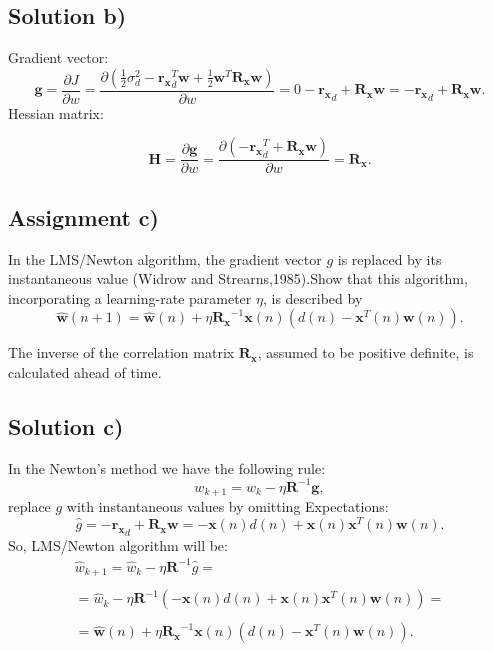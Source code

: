 \documentclass[a4paper, 12pt]{article}
\begin{document}
\subsection*{Solution b)}
Gradient vector:
\begin{equation*}
  \mathbf{g}= \frac{\partial J}{\partial w} = \frac{\partial (\frac{1}{2}\sigma_d^2 - \mathbf{r_x}_d^T\mathbf{w} +\frac{1}{2}\mathbf{w}^T \mathbf{R_x} \mathbf{w})}{\partial w} = 0-\mathbf{r_x}_d+\mathbf{R_x} \mathbf{w} =-\mathbf{r_x}_d+\mathbf{R_x} \mathbf{w} .
\end{equation*}
Hessian matrix:

\begin{equation*}
  \mathbf{H}= \frac{\partial \mathbf{g}}{\partial w} = \frac{\partial (-\mathbf{r_x}_d^T+\mathbf{R_x} \mathbf{w})}{\partial w} = \mathbf{R_x}.
\end{equation*}

\subsection*{Assignment c)}

In the LMS/Newton algorithm, the gradient vector $g$ is replaced by its instantaneous value (Widrow and
Strearns,1985).Show that this algorithm, incorporating a learning-rate parameter $\eta$, is described by
\begin{equation*}
  \mathbf{\hat{w}}(n+1)= \mathbf{\hat{w}}(n)+\eta \mathbf{R_x}^{-1} \mathbf{x}(n)(d(n) - \mathbf{x}^T(n) \mathbf{w}(n) ).
\end{equation*}

The inverse of the correlation matrix $\mathbf{R_x}$, assumed to be positive definite, is calculated ahead of time.
\subsection*{Solution c)}
In the Newton's method we have the following rule:
\begin{equation*}
  w_{k+1} = w_{k} - \eta \mathbf{R}^{-1}\mathbf{g},
\end{equation*}
replace $g$ with instantaneous values by omitting Expectations:
\begin{equation*}
  \hat{g} = - \mathbf{r_x}_d +\mathbf{R_x}\mathbf{w} = -\mathbf{x}(n)d(n) + \mathbf{x}(n)\mathbf{x}^T(n)\mathbf{w}(n).
\end{equation*}
So, LMS/Newton algorithm will be:
$$
\begin{array}{l}
  \hat{w}_{k+1} = \hat{w}_{k} - \eta \mathbf{R}^{-1}\hat{g} =\\
  \\
  =\hat{w}_{k} - \eta \mathbf{R}^{-1}(-\mathbf{x}(n)d(n) + \mathbf{x}(n)\mathbf{x}^T(n)\mathbf{w}(n)) =\\
  \\
  =\mathbf{\hat{w}}(n)+\eta \mathbf{R_x}^{-1} \mathbf{x}(n)(d(n) - \mathbf{x}^T(n) \mathbf{w}(n) ).
\end{array}
$$
\end{document}
